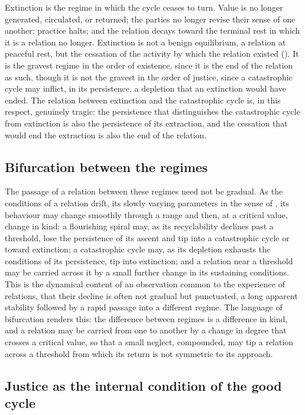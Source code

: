 Extinction is the regime in which the cycle ceases to turn. Value is no longer generated, circulated, or returned; the parties no longer revise their sense of one another; practice halts; and the relation decays toward the terminal rest in which it is a relation no longer. Extinction is not a benign equilibrium, a relation at peaceful rest, but the cessation of the activity by which the relation existed (). It is the gravest regime in the order of existence, since it is the end of the relation as such, though it is not the gravest in the order of justice, since a catastrophic cycle may inflict, in its persistence, a depletion that an extinction would have ended. The relation between extinction and the catastrophic cycle is, in this respect, genuinely tragic: the persistence that distinguishes the catastrophic cycle from extinction is also the persistence of its extraction, and the cessation that would end the extraction is also the end of the relation.

\subsection{Bifurcation between the regimes}
\label{p11:sec:reg-bifurcation}

The passage of a relation between these regimes need not be gradual. As the conditions of a relation drift, its slowly varying parameters in the sense of , its behaviour may change smoothly through a range and then, at a critical value, change in kind: a flourishing spiral may, as its recyclability declines past a threshold, lose the persistence of its ascent and tip into a catastrophic cycle or toward extinction; a catastrophic cycle may, as its depletion exhausts the conditions of its persistence, tip into extinction; and a relation near a threshold may be carried across it by a small further change in its sustaining conditions. This is the dynamical content of an observation common to the experience of relations, that their decline is often not gradual but punctuated, a long apparent stability followed by a rapid passage into a different regime. The language of bifurcation renders this: the difference between regimes is a difference in kind, and a relation may be carried from one to another by a change in degree that crosses a critical value, so that a small neglect, compounded, may tip a relation across a threshold from which its return is not symmetric to its approach.

\subsection{Justice as the internal condition of the good cycle}
\label{p11:sec:reg-justice}

